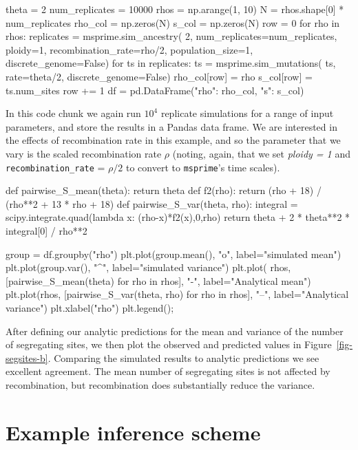 \documentclass[graybox]{svmult}
\newcommand{\msprime}[0]{\texttt{msprime}}
\begin{document}
\begin{pythoncode}
theta = 2
num_replicates = 10000
rhos = np.arange(1, 10)
N = rhos.shape[0] * num_replicates
rho_col = np.zeros(N)
s_col = np.zeros(N)
row = 0
for rho in rhos:
    replicates = msprime.sim_ancestry(
        2, num_replicates=num_replicates, ploidy=1,
        recombination_rate=rho/2, population_size=1,
        discrete_genome=False)
    for ts in replicates:
        ts = msprime.sim_mutations(
            ts, rate=theta/2, discrete_genome=False)
        rho_col[row] = rho
        s_col[row] = ts.num_sites
        row += 1
df = pd.DataFrame({"rho": rho_col, "s": s_col})
\end{pythoncode}

In this code chunk we again run $10^4$ replicate simulations for a range
of input parameters, and store the results in a Pandas data frame. We
are interested in the effects of recombination rate in this example,
and so the parameter that we vary is the scaled recombination rate
$\rho$ (noting, again, that we set \emph{ploidy = 1} and
\texttt{recombination\_rate} = $\rho / 2$ to convert to \msprime's
time scales).

\begin{pythoncode}
def pairwise_S_mean(theta):
    return theta
def f2(rho):
    return (rho + 18) / (rho**2 + 13 * rho + 18)
def pairwise_S_var(theta, rho):
    integral = scipy.integrate.quad(lambda x: (rho-x)*f2(x),0,rho)
    return theta + 2 * theta**2 * integral[0] / rho**2

group = df.groupby("rho")
plt.plot(group.mean(), "o", label="simulated mean")
plt.plot(group.var(), "^", label="simulated variance")
plt.plot(
    rhos, [pairwise_S_mean(theta) for rho in rhos], "-",
    label="Analytical mean")
plt.plot(rhos, [pairwise_S_var(theta, rho) for rho in rhos], "--",
label="Analytical variance")
plt.xlabel("rho")
plt.legend();
\end{pythoncode}

After defining our analytic predictions for the mean and variance of the
number of segregating sites, we then plot the observed and predicted values
in Figure~\ref{fig-segsites-b}.
Comparing the simulated results to analytic predictions we see
excellent agreement. The mean number of segregating sites is not
affected by recombination, but recombination does substantially reduce
the variance.

\section{Example inference scheme}\label{sec:inference}
\end{document}
